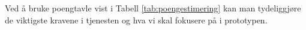 
Ved å bruke poengtavle vist i Tabell \ref{tab:poengestimering}  kan man tydeliggjøre de viktigste kravene i tjenesten og hva vi skal fokusere på i prototypen.


